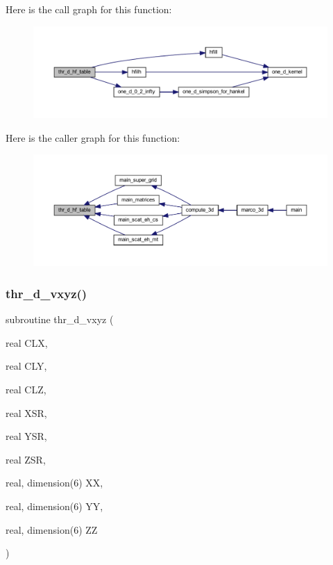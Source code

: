 Here is the call graph for this function\+:
\nopagebreak
\begin{figure}[H]
\begin{center}
\leavevmode
\includegraphics[width=350pt]{Marco_8f90_a0db0bc5f77e1fa8016abcd5554c1ae61_cgraph}
\end{center}
\end{figure}
Here is the caller graph for this function\+:
\nopagebreak
\begin{figure}[H]
\begin{center}
\leavevmode
\includegraphics[width=350pt]{Marco_8f90_a0db0bc5f77e1fa8016abcd5554c1ae61_icgraph}
\end{center}
\end{figure}
\mbox{\label{Marco_8f90_adcdc2c34804046e9cedb66856cd33a73}} 
\subsubsection{\texorpdfstring{thr\+\_\+d\+\_\+vxyz()}{thr\_d\_vxyz()}}
{\footnotesize\ttfamily subroutine thr\+\_\+d\+\_\+vxyz (\begin{DoxyParamCaption}\item[{real}]{C\+LX,  }\item[{real}]{C\+LY,  }\item[{real}]{C\+LZ,  }\item[{real}]{X\+SR,  }\item[{real}]{Y\+SR,  }\item[{real}]{Z\+SR,  }\item[{real, dimension(6)}]{XX,  }\item[{real, dimension(6)}]{YY,  }\item[{real, dimension(6)}]{ZZ }\end{DoxyParamCaption})}

